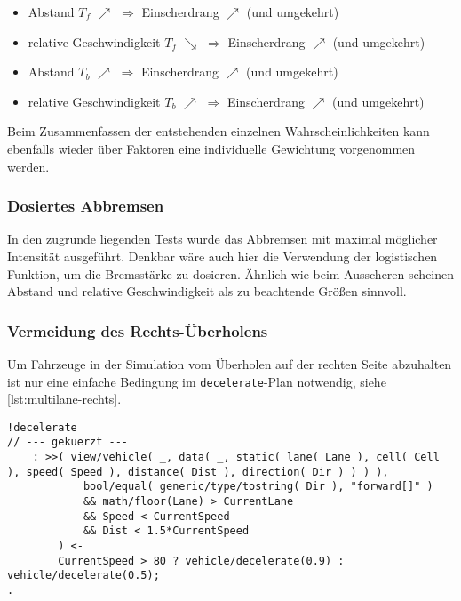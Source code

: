 \begin{itemize}
    \itemsep0em
    \item Abstand $ T_{f} $ $ \nearrow $ $ \Longrightarrow $ Einscherdrang $ \nearrow $ (und umgekehrt)
    \item relative Geschwindigkeit $ T_{f} $ $ \searrow $ $ \Longrightarrow $ Einscherdrang $ \nearrow $ (und umgekehrt)
    \item Abstand $ T_{b} $ $ \nearrow $ $ \Longrightarrow $ Einscherdrang $ \nearrow $ (und umgekehrt)
    \item relative Geschwindigkeit $ T_{b} $ $ \nearrow $ $ \Longrightarrow $ Einscherdrang $ \nearrow $ (und umgekehrt)
\end{itemize}

Beim Zusammenfassen der entstehenden einzelnen Wahrscheinlichkeiten kann ebenfalls wieder über Faktoren eine individuelle Gewichtung vorgenommen werden.



\subsubsection{Dosiertes Abbremsen}

In den zugrunde liegenden Tests wurde das Abbremsen mit maximal möglicher Intensität ausgeführt.
Denkbar wäre auch hier die Verwendung der logistischen Funktion, um die Bremsstärke zu dosieren.
Ähnlich wie beim Ausscheren scheinen Abstand und relative Geschwindigkeit als zu beachtende Größen sinnvoll.



\subsubsection{Vermeidung des Rechts-Überholens}

Um Fahrzeuge in der Simulation vom Überholen auf der rechten Seite abzuhalten ist nur eine einfache Bedingung im \texttt{decelerate}-Plan notwendig, siehe \cref{lst:multilane-rechts}.

\begin{minipage}[hptb]{0.95\textwidth}
\begin{lstlisting}[style=asl, 
                   keywords={Lane,CurrentLane}, 
                   keywords={[2]}, 
                   keywords={[3]}, 
                   caption={Auszug aus Agentenscript: Überholverbot rechts},
                   label={lst:multilane-rechts}]      
!decelerate
// --- gekuerzt ---
    : >>( view/vehicle( _, data( _, static( lane( Lane ), cell( Cell ), speed( Speed ), distance( Dist ), direction( Dir ) ) ) ), 
            bool/equal( generic/type/tostring( Dir ), "forward[]" ) 
            && math/floor(Lane) > CurrentLane
            && Speed < CurrentSpeed
            && Dist < 1.5*CurrentSpeed
        ) <-
        CurrentSpeed > 80 ? vehicle/decelerate(0.9) : vehicle/decelerate(0.5);
.\end{lstlisting}
\end{minipage}

